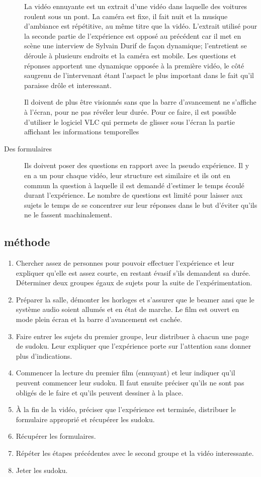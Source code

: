 \documentclass[12pt,fleqn,oneside,openany,]{book} %
\begin{document}
\begin{description}
	La vidéo ennuyante est un extrait d'une vidéo dans laquelle des voitures roulent sous un pont. La caméra est fixe, il fait nuit et la musique d'ambiance est répétitive, au même titre que la vidéo. L'extrait utilisé pour la seconde partie de l'expérience est opposé au précédent car il met en scène une interview de Sylvain Durif de façon dynamique; l'entretient se déroule à plusieurs endroits et la caméra est mobile. Les questions et réponses apportent une dynamique opposée à la première vidéo, le côté saugrenu de l'intervenant étant l'aspact le plus important dans le fait qu'il paraisse drôle et interessant. 

	Il doivent de plus être visionnés sans que la barre d'avancement ne s'affiche à l'écran, pour ne pas révéler leur durée. Pour ce faire, il est possible d'utiliser le logiciel VLC qui permets de glisser sous l'écran la partie affichant les informations temporelles
	\item[Des formulaires] Ils doivent poser des questions en rapport avec la pseudo expérience. Il y en a un pour chaque vidéo, leur structure est similaire et ils ont en commun la question à laquelle il est demandé d'estimer le temps écoulé durant l'expérience. Le nombre de questions est limité pour laisser aux sujets le temps de se concentrer sur leur réponses dans le but d'éviter qu'ils ne le fassent machinalement.
\end{description}

\subsection{méthode} \label{ssec:methode}
\begin{enumerate}
	\item Chercher assez de personnes pour pouvoir effectuer l'expérience et leur expliquer qu'elle est assez courte, en restant évasif s'ils demandent sa durée. Déterminer deux groupes égaux de sujets pour la suite de l'expérimentation.
	\item Préparer la salle, démonter les horloges et s'assurer que le beamer ansi que le système audio soient allumés et en état de marche. Le film est ouvert en mode plein écran et la barre d'avancement est cachée.
	\item Faire entrer les sujets du premier groupe, leur distribuer à chacun une page de sudoku. Leur expliquer que l'expérience porte sur l'attention sans donner plus d'indications. 
	\item Commencer la lecture du premier film (ennuyant) et leur indiquer qu'il peuvent commencer leur sudoku. Il faut ensuite préciser qu'ils ne sont pas obligés de le faire et qu'ils peuvent dessiner à la place. 
	\item À la fin de la vidéo, préciser que l'expérience est terminée, distribuer le formulaire approprié et récupérer les sudoku.
	\item Récupérer les formulaires.
	\item Répéter les étapes précédentes avec le second groupe et la vidéo interessante.
	\item Jeter les sudoku.
\end{enumerate}
\end{document}
